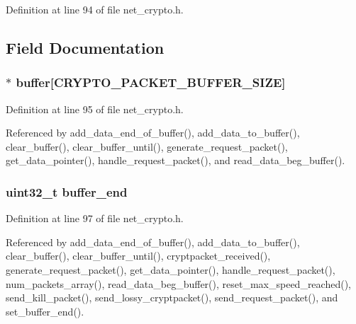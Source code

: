 Definition at line 94 of file net\+\_\+crypto.\+h.



\subsection{Field Documentation}
\hypertarget{struct_packets___array_ae9d4e6271fdb80e86ebb3e846fcd709c}{
\subsubsection[{buffer}]{$\ast$ buffer\mbox{[}{\bf C\+R\+Y\+P\+T\+O\+\_\+\+P\+A\+C\+K\+E\+T\+\_\+\+B\+U\+F\+F\+E\+R\+\_\+\+S\+I\+Z\+E}\mbox{]}}}\label{struct_packets___array_ae9d4e6271fdb80e86ebb3e846fcd709c}


Definition at line 95 of file net\+\_\+crypto.\+h.



Referenced by add\+\_\+data\+\_\+end\+\_\+of\+\_\+buffer(), add\+\_\+data\+\_\+to\+\_\+buffer(), clear\+\_\+buffer(), clear\+\_\+buffer\+\_\+until(), generate\+\_\+request\+\_\+packet(), get\+\_\+data\+\_\+pointer(), handle\+\_\+request\+\_\+packet(), and read\+\_\+data\+\_\+beg\+\_\+buffer().

\hypertarget{struct_packets___array_a66d710e0093872b26ee80118c1a85d99}{
\subsubsection[{buffer\+\_\+end}]{\setlength{\rightskip}{0pt plus 5cm}uint32\+\_\+t buffer\+\_\+end}}\label{struct_packets___array_a66d710e0093872b26ee80118c1a85d99}


Definition at line 97 of file net\+\_\+crypto.\+h.



Referenced by add\+\_\+data\+\_\+end\+\_\+of\+\_\+buffer(), add\+\_\+data\+\_\+to\+\_\+buffer(), clear\+\_\+buffer(), clear\+\_\+buffer\+\_\+until(), cryptpacket\+\_\+received(), generate\+\_\+request\+\_\+packet(), get\+\_\+data\+\_\+pointer(), handle\+\_\+request\+\_\+packet(), num\+\_\+packets\+\_\+array(), read\+\_\+data\+\_\+beg\+\_\+buffer(), reset\+\_\+max\+\_\+speed\+\_\+reached(), send\+\_\+kill\+\_\+packet(), send\+\_\+lossy\+\_\+cryptpacket(), send\+\_\+request\+\_\+packet(), and set\+\_\+buffer\+\_\+end().

